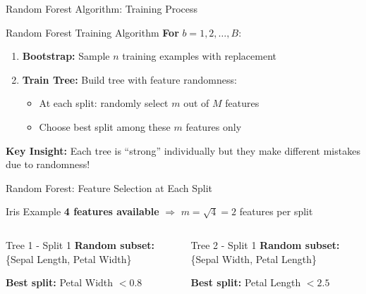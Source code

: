 \documentclass[10pt]{beamer}
\begin{document}
\begin{frame}{Random Forest Algorithm: Training Process}
\begin{alertbox}{Random Forest Training Algorithm}
\textbf{For } $b = 1, 2, \ldots, B$:
\begin{enumerate}
\item \textbf{Bootstrap:} Sample $n$ training examples with replacement
\item \textbf{Train Tree:} Build tree with feature randomness:
\begin{itemize}
\item At each split: randomly select $m$ out of $M$ features
\item Choose best split among these $m$ features only
\end{itemize}
\end{enumerate}
\end{alertbox}

\begin{keypointsbox}
\textbf{Key Insight:} Each tree is ``strong'' individually but they make different mistakes due to randomness!
\end{keypointsbox}
\end{frame}

\begin{frame}{Random Forest: Feature Selection at Each Split}
\begin{examplebox}{Iris Example}
\textbf{4 features available} $\Rightarrow$ $m = \sqrt{4} = 2$ features per split
\end{examplebox}

\begin{columns}
\begin{column}{0.48\textwidth}
\begin{definitionbox}{Tree 1 - Split 1}
\textbf{Random subset:} \{Sepal Length, Petal Width\}

\textbf{Best split:} Petal Width $< 0.8$
\end{definitionbox}
\end{column}

\begin{column}{0.48\textwidth}
\begin{definitionbox}{Tree 2 - Split 1}
\textbf{Random subset:} \{Sepal Width, Petal Length\}

\textbf{Best split:} Petal Length $< 2.5$
\end{definitionbox}
\end{column}
\end{columns}
\end{frame}
\end{document}
